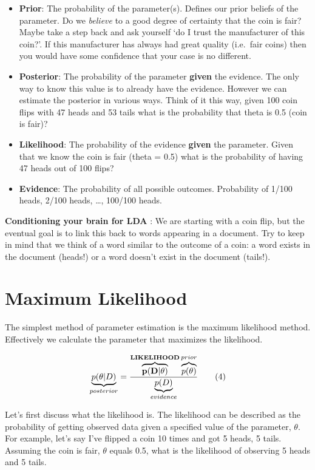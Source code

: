\documentclass[]{book}
\providecommand{\tightlist}{%
  \setlength{\itemsep}{0pt}\setlength{\parskip}{0pt}}
\theoremstyle{definition}
\theoremstyle{definition}
\theoremstyle{definition}
\theoremstyle{remark}
\begin{document}
\begin{itemize}
\tightlist
\item
  \textbf{Prior}: The probability of the parameter(s). Defines our prior
  beliefs of the parameter. Do we \emph{believe} to a good degree of
  certainty that the coin is fair? Maybe take a step back and ask
  yourself `do I trust the manufacturer of this coin?'. If this
  manufacturer has always had great quality (i.e.~fair coins) then you
  would have some confidence that your case is no different.
\item
  \textbf{Posterior}: The probability of the parameter \textbf{given}
  the evidence. The only way to know this value is to already have the
  evidence. However we can estimate the posterior in various ways. Think
  of it this way, given 100 coin flips with 47 heads and 53 tails what
  is the probability that theta is 0.5 (coin is fair)?
\item
  \textbf{Likelihood}: The probability of the evidence \textbf{given}
  the parameter. Given that we know the coin is fair (theta = 0.5) what
  is the probability of having 47 heads out of 100 flips?
\item
  \textbf{Evidence}: The probability of all possible outcomes.
  Probability of 1/100 heads, 2/100 heads, \ldots{}, 100/100 heads.
\end{itemize}

\textbf{Conditioning your brain for LDA} : We are starting with a coin
flip, but the eventual goal is to link this back to words appearing in a
document. Try to keep in mind that we think of a word similar to the
outcome of a coin: a word exists in the document (heads!) or a word
doesn't exist in the document (tails!).

\section{Maximum Likelihood}\label{maximum-likelihood}

The simplest method of parameter estimation is the maximum likelihood
method. Effectively we calculate the parameter that maximizes the
likelihood.

\[ 
\underbrace{p(\theta|D)}_{posterior} = {\overbrace{\bf \Large p(D|\theta)}^{\bf \Large LIKELIHOOD}
  \overbrace{p(\theta)}^{prior} \over \underbrace{p(D)}_{evidence}}
\tag{4}
\]

Let's first discuss what the likelihood is. The likelihood can be
described as the probability of getting observed data given a specified
value of the parameter, \(\theta\). For example, let's say I've flipped
a coin 10 times and got 5 heads, 5 tails. Assuming the coin is fair,
\(\theta\) equals 0.5, what is the likelihood of observing 5 heads and 5
tails.
\end{document}
